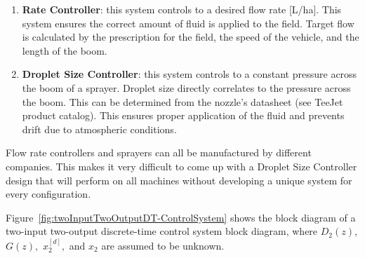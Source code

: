 \begin{enumerate}
\item \textbf{Rate Controller}: this system controls to a desired flow rate [L/ha].  This system ensures the correct amount of fluid is applied to the field.  Target flow is calculated by the prescription for the field, the speed of the vehicle, and the length of the boom. 

\item \textbf{Droplet Size Controller}: this system controls to a constant pressure across the boom of a sprayer.  Droplet size directly correlates to the pressure across the boom. This can be determined from the nozzle’s datasheet (see TeeJet product catalog).  This ensures proper application of the fluid and prevents drift due to atmospheric conditions.  

\end{enumerate}

Flow rate controllers and sprayers can all be manufactured by different companies.  This makes it very difficult to come up 
with a Droplet Size Controller design that will perform on all machines without developing a unique system for every configuration.

Figure~\ref{fig:twoInputTwoOutputDT-ControlSystem} shows the block diagram of a two-input two-output discrete-time control system block diagram, where  $D_2(z),$ $G(z),$ $x_2^{[d]},$ and $x_2$ are assumed to be unknown.
%

